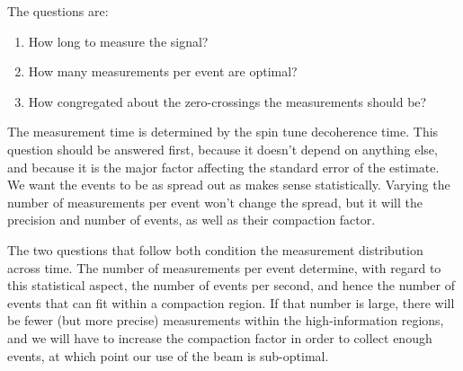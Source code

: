 \documentclass{article}
\begin{document}
The questions are:
\begin{enumerate}
	\item How long to measure the signal?
	\item How many measurements per event are optimal?
	\item How congregated about the zero-crossings the measurements should be?
\end{enumerate}

The measurement time is determined by the spin tune decoherence time. This question should be answered first, because it doesn't depend on anything else, and because it is the major factor affecting the standard error of the estimate. We want the events to be as spread out as makes sense statistically. Varying the number of measurements per event won't change the spread, but it will the precision and number of events, as well as their compaction factor.

The two questions that follow both condition the measurement distribution across time. The number of measurements per event determine, with regard to this statistical aspect, the number of events per second, and hence the number of events that can fit within a compaction region. If that number is large, there will be fewer (but more precise) measurements within the high-information regions, and we will have to increase the compaction factor in order to collect enough events, at which point our use of the beam is sub-optimal.
\end{document}

